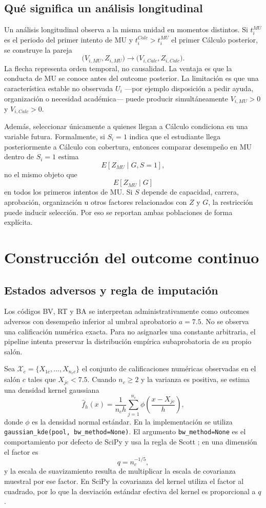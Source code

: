 \documentclass[11pt,letterpaper]{article}
\newcommand{\code}[1]{\texttt{#1}}
\begin{document}
\subsection{Qué significa un análisis longitudinal}

Un análisis longitudinal observa a la misma unidad en momentos distintos. Si $t_i^{MU}$ es el periodo del primer intento de MU y $t_i^{Calc}>t_i^{MU}$ el primer Cálculo posterior, se construye la pareja
\[
\bigl(V_{i,MU},Z_{i,MU}\bigr) \longrightarrow \bigl(V_{i,Calc},Z_{i,Calc}\bigr).
\]
La flecha representa orden temporal, no causalidad. La ventaja es que la conducta de MU se conoce antes del outcome posterior. La limitación es que una característica estable no observada $U_i$ ---por ejemplo disposición a pedir ayuda, organización o necesidad académica--- puede producir simultáneamente $V_{i,MU}>0$ y $V_{i,Calc}>0$.

Además, seleccionar únicamente a quienes llegan a Cálculo condiciona en una variable futura. Formalmente, si $S_i=1$ indica que el estudiante llega posteriormente a Cálculo con cobertura, entonces comparar desempeño en MU dentro de $S_i=1$ estima
\[
E[Z_{MU}\mid G,S=1],
\]
no el mismo objeto que
\[
E[Z_{MU}\mid G]
\]
en todos los primeros intentos de MU. Si $S$ depende de capacidad, carrera, aprobación, organización u otros factores relacionados con $Z$ y $G$, la restricción puede inducir selección. Por eso se reportan ambas poblaciones de forma explícita.

\section{Construcción del outcome continuo}

\subsection{Estados adversos y regla de imputación}

Los códigos BV, RT y BA se interpretan administrativamente como outcomes adversos con desempeño inferior al umbral aprobatorio $a=7.5$. No se observa una calificación numérica exacta. Para no asignarles una constante arbitraria, el pipeline intenta preservar la distribución empírica subaprobatoria de su propio salón.

Sea $\mathcal X_c=\{X_{1c},\dots,X_{n_c c}\}$ el conjunto de calificaciones numéricas observadas en el salón $c$ tales que $X_{jc}<7.5$. Cuando $n_c\ge2$ y la varianza es positiva, se estima una densidad kernel gaussiana
\[
\widehat f_h(x)=\frac{1}{n_c h}\sum_{j=1}^{n_c}\phi\!\left(\frac{x-X_{jc}}{h}\right),
\]
donde $\phi$ es la densidad normal estándar. En la implementación se utiliza \code{gaussian\_kde(pool, bw\_method=None)}. El argumento \code{bw\_method=None} es el comportamiento por defecto de SciPy y usa la regla de Scott \citep{scott1992}; en una dimensión el factor es
\[
q=n_c^{-1/5},
\]
y la escala de suavizamiento resulta de multiplicar la escala de covarianza muestral por ese factor. En SciPy la covarianza del kernel utiliza el factor al cuadrado, por lo que la desviación estándar efectiva del kernel es proporcional a $q$.
\end{document}
